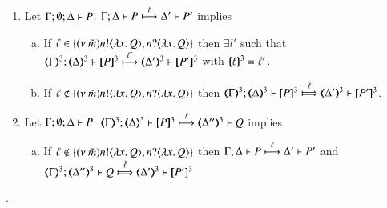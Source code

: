 \begin{proposition}\rm
	\begin{enumerate}
		\item	Let $\Gamma; \emptyset; \Delta \vdash P$.
			$\Gamma; \Delta \vdash P \stackrel{\ell}{\longmapsto} \Delta' \vdash P'$ implies
%
			\begin{enumerate}[a)]
				\item	If $\ell \in \{(\nu\ \tilde{m}) n ! \langle \lambda x.\,Q \rangle, n ? \langle \lambda x.\,Q \rangle\}$ then
					$\exists l' $ such that
					$\horel{\tmap{\Gamma}{3}}{\tmap{\Delta}{3}}{\pmap{P}{3}}{\hby{\ell'}}
					{\tmap{\Delta'}{3}}{\pmap{P'}{3}}$ with $\{\!\!\{\ell\}\!\!\}^{3} = \ell'$.

%
%

				\item	If $\ell \notin \{(\nu\ \tilde{m}) n ! \langle \lambda x.\,Q \rangle, n ? \langle \lambda x.\,Q \rangle\}$ then
					$\horel{\tmap{\Gamma}{3}}{\tmap{\Delta}{3}}{\pmap{P}{3}}{\Hby{\hat{\ell}}}
					{\tmap{\Delta'}{3}}{\pmap{P'}{3}}$.
			\end{enumerate}

		\item	Let $\Gamma; \emptyset; \Delta \vdash P$.
			$\horel{\tmap{\Gamma}{3}}{\tmap{\Delta}{3}}{\pmap{P}{3}}{\hby{\ell}}
			{\tmap{\Delta''}{3}}{Q}$ implies
%
			\begin{enumerate}[a)]
				\item	If $\ell \notin \{(\nu\ \tilde{m}) n ! \langle \lambda x.\,Q \rangle, n ? \langle \lambda x.\,Q \rangle\}$
					then
					$\Gamma; \Delta \vdash P \stackrel{\ell}{\longmapsto} \Delta' \vdash P'$
					and $\horel{\tmap{\Gamma}{3}}{\tmap{\Delta''}{3}}{Q}{\Hby{\hat{\ell}}}{\tmap{\Delta'}{3}}{\pmap{P'}{3}}$
			\end{enumerate}
	\end{enumerate}
\end{proposition}

.
